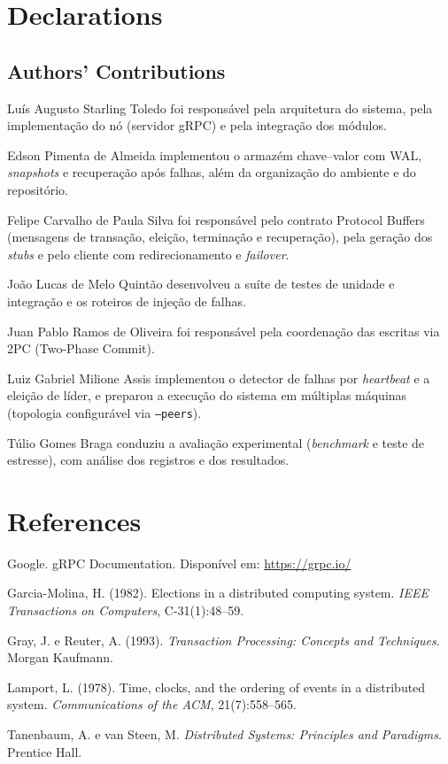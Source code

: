 \documentclass[10pt,twocolumn]{article}
\begin{document}
\section*{Declarations}

\subsection*{Authors' Contributions}

{\small
Luís Augusto Starling Toledo foi responsável pela arquitetura do sistema,
pela implementação do nó (servidor gRPC) e pela integração dos
módulos.

Edson Pimenta de Almeida implementou o armazém chave--valor com WAL,
\emph{snapshots} e recuperação após falhas, além da organização do
ambiente e do repositório.

Felipe Carvalho de Paula Silva foi responsável pelo contrato Protocol
Buffers (mensagens de transação, eleição, terminação e recuperação), pela
geração dos \emph{stubs} e pelo cliente com redirecionamento e
\emph{failover}.

João Lucas de Melo Quintão desenvolveu a suíte de testes de unidade e
integração e os roteiros de injeção de falhas.

Juan Pablo Ramos de Oliveira foi responsável pela coordenação das
escritas via 2PC (Two-Phase Commit).

Luiz Gabriel Milione Assis implementou o detector de falhas por
\emph{heartbeat} e a eleição de líder, e preparou a execução do sistema em
múltiplas máquinas (topologia configurável via \texttt{--peers}).

Túlio Gomes Braga conduziu a avaliação experimental (\emph{benchmark} e
teste de estresse), com análise dos registros e dos resultados.
\par}

\section*{References}

{\small
\noindent [1] Google. gRPC Documentation. Disponível em:
\url{https://grpc.io/}

\noindent [2] Garcia-Molina, H. (1982). Elections in a distributed
computing system. \emph{IEEE Transactions on Computers}, C-31(1):48--59.

\noindent [3] Gray, J. e Reuter, A. (1993). \emph{Transaction Processing:
Concepts and Techniques}. Morgan Kaufmann.

\noindent [4] Lamport, L. (1978). Time, clocks, and the ordering of events
in a distributed system. \emph{Communications of the ACM},
21(7):558--565.

\noindent [5] Tanenbaum, A. e van Steen, M. \emph{Distributed Systems:
Principles and Paradigms}. Prentice Hall.
\par}
\end{document}
